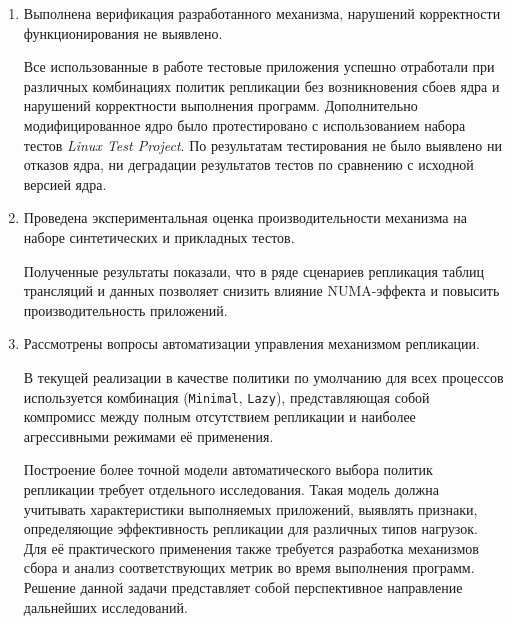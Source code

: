 \begin{enumerate}
    \item Выполнена верификация разработанного механизма, нарушений корректности функционирования не выявлено.

    Все использованные в работе тестовые приложения успешно отработали при различных комбинациях политик репликации без возникновения сбоев ядра и нарушений корректности выполнения программ. Дополнительно модифицированное ядро было протестировано с использованием набора тестов \textit{Linux Test Project}\cite{ltp}. По результатам тестирования не было выявлено ни отказов ядра, ни деградации результатов тестов по сравнению с исходной версией ядра.

    \item Проведена экспериментальная оценка производительности механизма на наборе синтетических и прикладных тестов.

    Полученные результаты показали, что в ряде сценариев репликация таблиц трансляций и данных позволяет снизить влияние NUMA-эффекта и повысить производительность приложений.

    \item Рассмотрены вопросы автоматизации управления механизмом репликации.

    В текущей реализации в качестве политики по умолчанию для всех процессов используется комбинация (\texttt{Minimal}, \texttt{Lazy}), представляющая собой компромисс между полным отсутствием репликации и наиболее агрессивными режимами её применения.

    Построение более точной модели автоматического выбора политик репликации требует отдельного исследования. Такая модель должна учитывать характеристики выполняемых приложений, выявлять признаки, определяющие эффективность репликации для различных типов нагрузок. Для её практического применения также требуется разработка механизмов сбора и анализ соответствующих метрик во время выполнения программ. Решение данной задачи представляет собой перспективное направление дальнейших исследований.
\end{enumerate}

